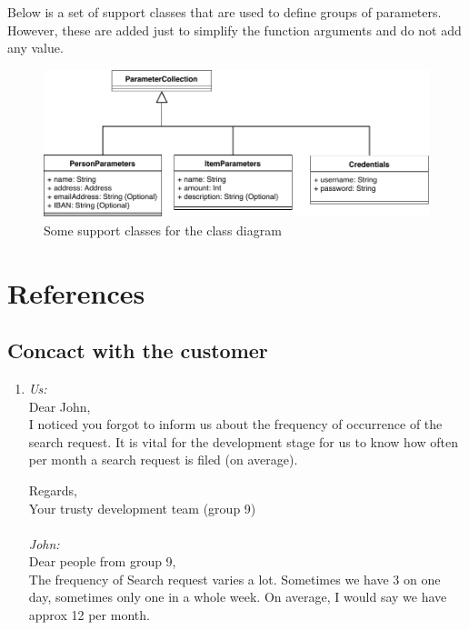 \documentclass{article}
\begin{document}
Below is a set of support classes that are used to define groups of parameters. However, these are added just to simplify the function arguments and do not add any value.



\begin{figure}[H]
	\centering
	\includegraphics{uml/classdiagramsupport.pdf}
	\caption*{Some support classes for the class diagram}
\end{figure}

\section{References}
\subsection*{Concact with the customer}
\begin{enumerate}[1.]
	\item \label{conv1}\textsl{Us:}\\
	Dear John,\\

I noticed you forgot to inform us about the frequency of occurrence of the search request. It is vital for the development stage for us to know how often per month a search request is filed (on average).

Regards,\\
Your trusty development team (group 9)\\
\vspace{10pt}\\
\textsl{John:}\\
Dear people from group 9,\\

The frequency of Search request varies a lot. Sometimes we have 3 on one day, sometimes only one in a whole week. On average, I would say we have approx 12 per month.
\end{enumerate}
\end{document}

